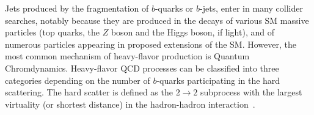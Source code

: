 Jets produced by the fragmentation of $b$-quarks or $b$-jets, enter in many collider searches, notably because they are produced in the decays of various SM massive particles (top quarks, the $Z$ boson and the Higgs boson, if light), and of numerous particles appearing in proposed extensions of the SM. However, the most common mechanism of heavy-flavor production is Quantum Chromdynamics. Heavy-flavor QCD processes can be classified into three categories 
depending on the number of $b$-quarks participating in the hard scattering. The hard scatter is defined as the $2 \rightarrow 2$ subprocess with the largest virtuality (or shortest distance) in the hadron-hadron interaction~\cite{Norrbin:2000zc}.



